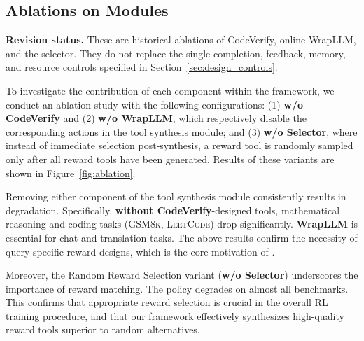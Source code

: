 


\subsection{Ablations on Modules}

\noindent\textbf{Revision status.} These are historical ablations of CodeVerify, online WrapLLM, and the selector. They do not replace the single-completion, feedback, memory, and resource controls specified in Section~\ref{sec:design_controls}.


To investigate the contribution of each component within the \method{} framework, we conduct an ablation study with the following configurations: (1) \textbf{w/o CodeVerify} and (2) \textbf{w/o WrapLLM}, which respectively disable the corresponding actions in the tool synthesis module; and (3) \textbf{w/o Selector}, where instead of immediate selection post-synthesis, a reward tool is randomly sampled only after all reward tools have been generated. Results of these variants are shown in Figure~\ref{fig:ablation}.

Removing either component of the tool synthesis module consistently results in degradation. Specifically, \textbf{without CodeVerify}-designed tools, mathematical reasoning and coding tasks (\textsc{GSM8k, LeetCode}) drop significantly. \textbf{WrapLLM} is essential for chat and translation tasks. The above results confirm the necessity of query-specific reward designs, which is the core motivation of \method{}. 


Moreover, the Random Reward Selection variant (\textbf{w/o Selector}) underscores the importance of reward matching. The policy degrades on almost all benchmarks. This confirms that appropriate reward selection is crucial in the overall RL training procedure, and that our framework effectively synthesizes high-quality reward tools superior to random alternatives.



